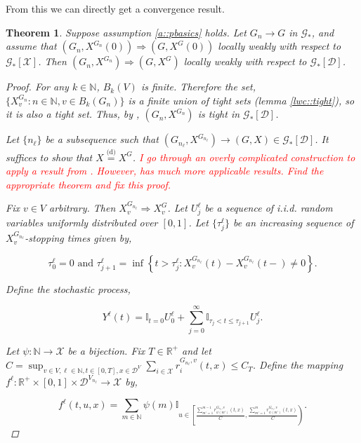 \documentclass[12pt]{article}
\newcommand{\mb}{\mathbb}
\newcommand{\mc}{\mathcal}
\newcommand{\ra}{\rightarrow}
\newcommand{\te}{\text}
\newcommand{\tr}{\textcolor{red}}
\newcommand{\ind}{\hspace{24pt}}
\newcommand{\deq}{\overset{\text{(d)}}{=}}			%
\newcommand{\cad}{\mc{D}}							%
\newcommand{\sta}{\mc{X}}							%
\newcommand{\Xf}{X}									%
\newcommand{\rate}{r}								%
\newcommand{\xf}{x}									%
\newcommand{\vind}[1]{_{#1}}						%
\newcommand{\tme}[1]{(#1)}							%
\newcommand{\gind}[1]{^{#1}}						%
\newcommand{\stpara}[1]{_{#1}}						%
\newcommand{\gvpara}[2]{^{#1,#2}}					%
\newcommand{\jumpbd}[1]{C_{#1}}						%
\newcommand{\tmepro}[2]{(#1,#2)}					%
\newcommand{\Gs}{\mc{G}_\ast}						%
\newcommand{\trnc}[1]{B_{#1}}						%
\renewcommand{\sp}[1]{[#1]}							%
\newcommand{\Xg}{Y}									%
\newcommand{\rt}{\tau}								%
\renewcommand{\it}[1]{_{#1}}						%
\newtheorem{thms}{Theorem}[section]
\begin{document}
From this we can directly get a convergence result.

\begin{thms}
Suppose assumption \ref{a::pbasics} holds. Let \(G\it{n} \ra G\) in \(\Gs\), and assume that \((G\it{n},\Xf\gind{G\it{n}}\tme{0}) \Rightarrow (G,\Xf\gind{G}\tme{0})\) locally weakly with respect to \(\Gs\sp{\sta}\). Then \((G\it{n},\Xf\gind{G\it{n}}) \Rightarrow (G,\Xf\gind{G})\) locally weakly with respect to \(\Gs\sp{\cad}\).

\begin{proof}
For any \(k \in \mb{N}\), \(\trnc{k}(V)\) is finite. Therefore the set, \(\{\Xf\gind{G\it{n}}\vind{v}: n \in \mb{N}, v \in \trnc{k}(G\it{n})\}\) is a finite union of tight sets (lemma \ref{lwc::tight}), so it is also a tight set. Thus, by \cite[Lemma A.6]{LacRamWu19}, \((G\it{n},\Xf\gind{G\it{n}})\) is tight in \(\Gs\sp{\cad}\).

\ind Let \(\{n_\ell\}\) be a subsequence such that \((G\it{n_\ell},\Xf\gind{G\it{n_\ell}}) \ra (G,\Xf) \in \Gs\sp{\cad}\). It suffices to show that \(\Xf \deq \Xf\gind{G}\). \tr{I go through an overly complicated construction to apply a result from \cite{KurPro91}. However, \cite{Kur91} has much more applicable results. Find the appropriate theorem and fix this proof.}

\ind Fix \(v \in V\) arbitrary. Then \(\Xf\gind{G\it{n_\ell}}\vind{v} \Rightarrow \Xf\gind{G}\vind{v}\). Let \(U\it{j}^\ell\) be a sequence of i.i.d. random variables uniformly distributed over \([0,1]\). Let \(\{\rt\it{j}^\ell\}\) be an increasing sequence of \(\Xf\gind{G\it{n_\ell}}\vind{v}\)-stopping times given by,

\[\rt\it{0}^\ell = 0\te{ and } \rt\it{j+1}^\ell = \inf\left\{t > \rt\it{j}^\ell: \Xf\gind{G\it{n_\ell}}\vind{v}\tme{t} - \Xf\gind{G\it{n_\ell}}\vind{v}\tme{t-} \neq 0\right\}.\]

Define the stochastic process,

\[\Xg^\ell\tme{t} = \mb{I}_{t = 0}U^\ell\it{0} + \sum_{j=0}^\infty \mb{I}_{\rt\it{j} < t \leq \rt\it{j+1}} U^\ell\it{j}.\]

Let \(\psi: \mb{N} \ra \sta\) be a bijection. Fix \(T \in \mb{R}^+\) and let \(C = \sup_{v \in V,\ell \in \mb{N},t \in [0,T],\xf\in\cad^V}\sum_{i\in \sta} \rate\gvpara{G\it{n_\ell}}{v}\stpara{i}\tmepro{t}{\xf}\leq \jumpbd{T}\). Define the mapping \(f^\ell:\mb{R}^+\times [0,1] \times \cad^{V\it{n_\ell}}\ra \sta\) by,

\[f^\ell(t,u,\xf) = \sum_{m\in \mb{N}} \psi(m)\mb{I}_{u \in \left[\frac{\sum_{m'=1}^{m-1} \rate\gvpara{G\it{n_\ell}}{v}\stpara{\psi(m')}\tmepro{t}{\xf}}{C}, \frac{\sum_{m'=1}^{m} \rate\gvpara{G\it{n_\ell}}{v}\stpara{\psi(m')}\tmepro{t}{\xf}}{C}\right)}.\]


\end{proof}
\end{thms}
\end{document}
